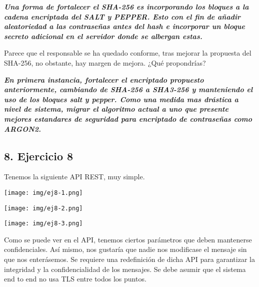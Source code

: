 \documentclass[12pt,oneside,a4paper]{book}
\newcommand{\newsection}[1]{{\subsection*{#1}
\addcontentsline{toc}{section}{#1}}}
\begin{document}
\hspace{20pt}
\textbf{\textit{Una forma de fortalecer el SHA-256 es incorporando los bloques a la cadena encriptada del SALT y PEPPER. Esto con el fin de añadir aleatoriedad a las contraseñas antes del hash e incorporar un bloque secreto adicional en el servidor donde se albergan estas.}}

\vspace{1em}

Parece que el responsable se ha quedado conforme, tras mejorar la propuesta del SHA-256,
no obstante, hay margen de mejora. ¿Qué propondrías?

\vspace{1em}

\hspace{20pt}
\textbf{\textit{En primera instancia, fortalecer el encriptado propuesto anteriormente, cambiando de SHA-256 a SHA3-256 y manteniendo el uso de los bloques salt y pepper. Como una medida mas drástica a nivel de sistema, migrar el algoritmo actual a uno que presente mejores estandares de seguridad para encriptado de contraseñas como ARGON2.}}

\newpage

\newsection{8. Ejercicio 8}

\vspace{2em}

\hspace{20pt}
Tenemos la siguiente API REST, muy simple.

\vspace{1em}

\begin{center}
    \texttt{[image: img/ej8-1.png]}
\end{center}

\begin{center}
    \texttt{[image: img/ej8-2.png]}
\end{center}

\begin{center}
    \texttt{[image: img/ej8-3.png]}
\end{center}

\vspace{2em}

\hspace{20pt}
Como se puede ver en el API, tenemos ciertos parámetros que deben mantenerse
confidenciales. Así mismo, nos gustaría que nadie nos modificase el mensaje sin que nos
enterásemos. Se requiere una redefinición de dicha API para garantizar la integridad y la
confidencialidad de los mensajes. Se debe asumir que el sistema end to end no usa TLS entre
todos los puntos.
\end{document}
